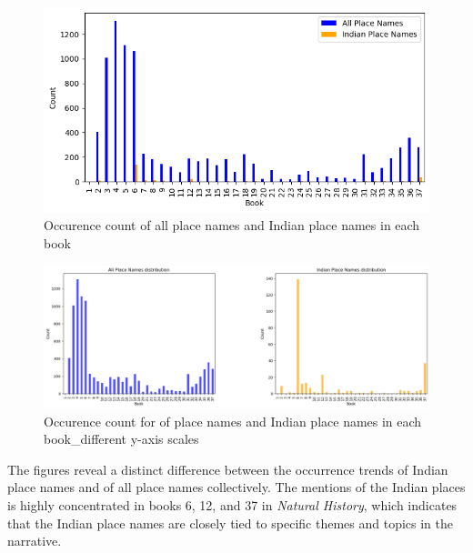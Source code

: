 \documentclass[
  12pt,
]{article}
\begin{document}
\begin{figure}

{\centering \includegraphics{NHthesis_structure_files/figure-pdf/fig-grouped_place_name_count_comparison-output-1.png}

}

\caption{\label{fig-grouped_place_name_count_comparison}Occurence count
of all place names and Indian place names in each book}

\end{figure}

\begin{figure}

{\centering \includegraphics{NHthesis_structure_files/figure-pdf/fig-subplots_place_name_count_comparison-output-1.png}

}

\caption{\label{fig-subplots_place_name_count_comparison}Occurence count
for of place names and Indian place names in each book\_different y-axis
scales}

\end{figure}

The figures reveal a distinct difference between the occurrence trends
of Indian place names and of all place names collectively. The mentions
of the Indian places is highly concentrated in books 6, 12, and 37 in
\emph{Natural History}, which indicates that the Indian place names are
closely tied to specific themes and topics in the narrative.
\end{document}

